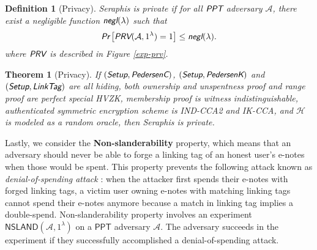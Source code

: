 \documentclass{article}
\newtheorem{definition}{Definition}[section]
\newtheorem{theorem}{Theorem}[section]
\begin{document}
\begin{definition}[Privacy]
Seraphis is private if for all $\emph{\textsf{PPT}}$ adversary $\mathcal{A}$, there exist a negligible function $\emph{\textsf{negl}}(\lambda)$ such that
\begin{align*}
\emph{\textsf{Pr}}
\left[
\emph{\textsf{PRV}}(\mathcal{A}, 1^{\lambda})=1
\right]
\le \emph{\textsf{negl}}(\lambda).
\end{align*}
where $\emph{\textsf{PRV}}$ is described in Figure \ref{exp-prv}.
\end{definition}
\begin{theorem}[Privacy]\label{thm-prv}
If $(\emph{\textsf{Setup}},\emph{\textsf{PedersenC}})$, $(\emph{\textsf{Setup}},\emph{\textsf{PedersenK}})$ and $(\emph{\textsf{Setup}},\emph{\textsf{LinkTag}})$ are all hiding, both ownership and unspentness proof and range proof are perfect special HVZK, membership proof is witness indistinguishable, authenticated symmetric encryption scheme is IND-CCA2 and IK-CCA, and $\mathcal{H}$ is modeled as a random oracle, then Seraphis is private.  
\end{theorem}

Lastly, we consider the \textbf{Non-slanderability} property, which means that an adversary should never be able to forge a linking tag of an honest user's e-notes when those would be spent. This property prevents the following attack known as \textit{denial-of-spending attack} \cite{denial-of-spend}: when the attacker first spends their e-notes with forged linking tags, a victim user owning e-notes with matching linking tags cannot spend their e-notes anymore because a match in linking tag implies a double-spend. Non-slanderability property involves an experiment $\textsf{NSLAND}(\mathcal{A}, 1^{\lambda})$ on a $\textsf{PPT}$ adversary $\mathcal{A}$. The adversary succeeds in the experiment if they successfully accomplished a denial-of-spending attack.
\end{document}
